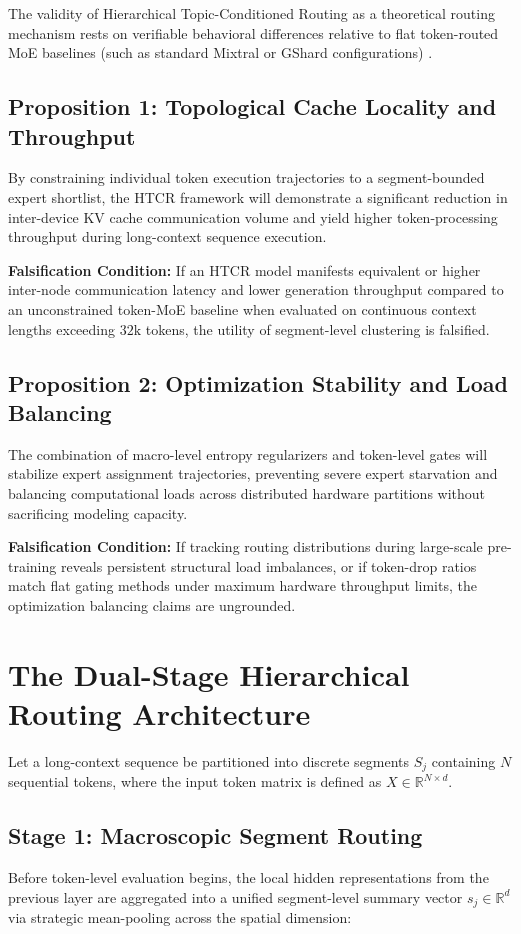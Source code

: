The validity of Hierarchical Topic-Conditioned Routing as a theoretical routing mechanism rests on verifiable behavioral differences relative to flat token-routed MoE baselines (such as standard Mixtral or GShard configurations) \cite{Lepikhin2021}.

\section*{Proposition 1: Topological Cache Locality and Throughput}
By constraining individual token execution trajectories to a segment-bounded expert shortlist, the HTCR framework will demonstrate a significant reduction in inter-device KV cache communication volume and yield higher token-processing throughput during long-context sequence execution.

\textbf{Falsification Condition:} If an HTCR model manifests equivalent or higher inter-node communication latency and lower generation throughput compared to an unconstrained token-MoE baseline when evaluated on continuous context lengths exceeding $32\text{k}$ tokens, the utility of segment-level clustering is falsified.

\section*{Proposition 2: Optimization Stability and Load Balancing}
The combination of macro-level entropy regularizers and token-level gates will stabilize expert assignment trajectories, preventing severe expert starvation and balancing computational loads across distributed hardware partitions without sacrificing modeling capacity.

\textbf{Falsification Condition:} If tracking routing distributions during large-scale pre-training reveals persistent structural load imbalances, or if token-drop ratios match flat gating methods under maximum hardware throughput limits, the optimization balancing claims are ungrounded.

\chapter{The Dual-Stage Hierarchical Routing Architecture}

Let a long-context sequence be partitioned into discrete segments $S_j$ containing $N$ sequential tokens, where the input token matrix is defined as $X \in \mathbb{R}^{N \times d}$. 

\section{Stage 1: Macroscopic Segment Routing}
Before token-level evaluation begins, the local hidden representations from the previous layer are aggregated into a unified segment-level summary vector $s_j \in \mathbb{R}^{d}$ via strategic mean-pooling across the spatial dimension:


